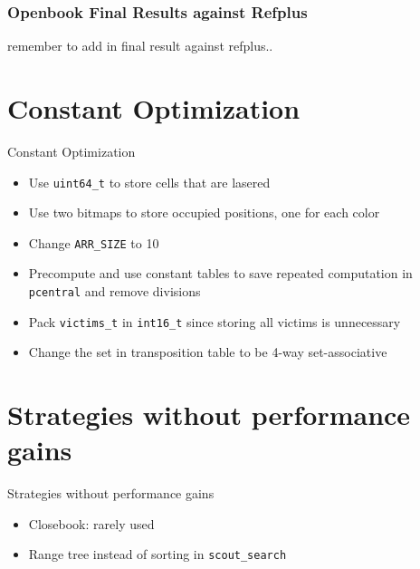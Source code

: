 \documentclass[10pt]{beamer}
\newcommand{\tred}[1]{\textcolor{dred}{#1}}
\newcommand{\itema}{\item[*]}
\begin{document}
	\begin{frame}
		\frametitle{Openbook Final Results against Refplus}

		\tred{remember to add in final result against refplus..}

	\end{frame}

	\section{Constant Optimization}
	\begin{frame}{Constant Optimization}
        \begin{itemize}
            \itema Use {\tt uint64\_t} to store cells that are lasered
            \itema Use two bitmaps to store occupied positions, one for each color
            \itema Change {\tt ARR\_SIZE} to 10
            \itema Precompute and use constant tables to save repeated computation in {\tt pcentral} and remove divisions
            \itema Pack {\tt victims\_t} in {\tt int16\_t} since storing all victims is unnecessary
            \itema Change the set in transposition table to be 4-way set-associative
        \end{itemize}
	\end{frame}


	\section{Strategies without performance gains}
	\begin{frame}{Strategies without performance gains}
	    \begin{itemize}
	        \itema Closebook: rarely used
	        \itema Range tree instead of sorting in  {\tt scout\_search}
	    \end{itemize}
	\end{frame}
\end{document}
